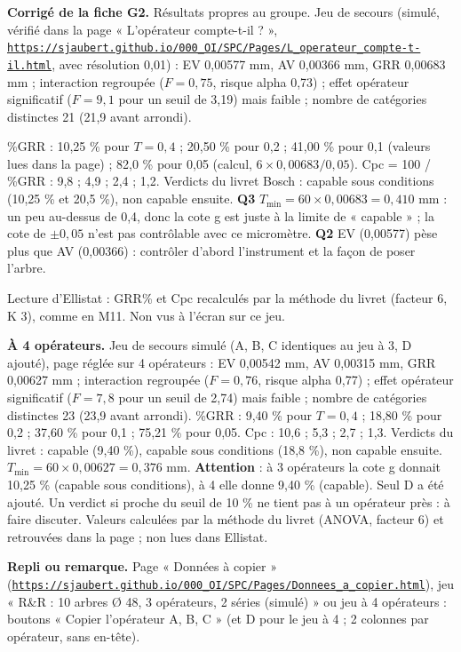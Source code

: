 \textbf{\color{ok}Corrigé de la fiche G2.} Résultats propres au groupe. Jeu de secours (simulé, vérifié dans la page « L'opérateur compte-t-il ? », \href{https://sjaubert.github.io/000_OI/SPC/Pages/L_operateur_compte-t-il.html}{\nolinkurl{https://sjaubert.github.io/000_OI/SPC/Pages/L_operateur_compte-t-il.html}}, avec résolution 0,01) : EV 0,00577 mm, AV 0,00366 mm, GRR 0,00683 mm ; interaction regroupée ($F = 0{,}75$, risque alpha 0,73) ; effet opérateur significatif ($F = 9{,}1$ pour un seuil de 3,19) mais faible ; nombre de catégories distinctes 21 (21,9 avant arrondi).\par \%GRR : 10,25 \% pour $T = 0{,}4$ ; 20,50 \% pour 0,2 ; 41,00 \% pour 0,1 (valeurs lues dans la page) ; 82,0 \% pour 0,05 (calcul, $6 \times 0{,}00683 / 0{,}05$). Cpc = 100 / \%GRR : 9,8 ; 4,9 ; 2,4 ; 1,2. Verdicts du livret Bosch : capable sous conditions (10,25 \% et 20,5 \%), non capable ensuite. \textbf{Q3} $T_{\min} = 60 \times 0{,}00683 = 0{,}410$ mm : un peu au-dessus de 0,4, donc la cote g est juste à la limite de « capable » ; la cote de $\pm 0{,}05$ n'est pas contrôlable avec ce micromètre. \textbf{Q2} EV (0,00577) pèse plus que AV (0,00366) : contrôler d'abord l'instrument et la façon de poser l'arbre.\par Lecture d'Ellistat : GRR\% et Cpc recalculés par la méthode du livret (facteur 6, K 3), comme en M11. Non vus à l'écran sur ce jeu.\par \textbf{À 4 opérateurs.} Jeu de secours simulé  (A, B, C identiques au jeu à 3, D ajouté), page réglée sur 4 opérateurs : EV 0,00542 mm, AV 0,00315 mm, GRR 0,00627 mm ; interaction regroupée ($F = 0{,}76$, risque alpha 0,77) ; effet opérateur significatif ($F = 7{,}8$ pour un seuil de 2,74) mais faible ; nombre de catégories distinctes 23 (23,9 avant arrondi). \%GRR : 9,40 \% pour $T = 0{,}4$ ; 18,80 \% pour 0,2 ; 37,60 \% pour 0,1 ; 75,21 \% pour 0,05. Cpc : 10,6 ; 5,3 ; 2,7 ; 1,3. Verdicts du livret : capable (9,40 \%), capable sous conditions (18,8 \%), non capable ensuite. $T_{\min} = 60 \times 0{,}00627 = 0{,}376$ mm. \textbf{Attention} : à 3 opérateurs la cote g donnait 10,25 \% (capable sous conditions), à 4 elle donne 9,40 \% (capable). Seul D a été ajouté. Un verdict si proche du seuil de 10 \% ne tient pas à un opérateur près : à faire discuter. Valeurs calculées par la méthode du livret (ANOVA, facteur 6) et retrouvées dans la page ; non lues dans Ellistat.\par
{\small\textbf{Repli ou remarque.} Page « Données à copier » (\href{https://sjaubert.github.io/000_OI/SPC/Pages/Donnees_a_copier.html}{\nolinkurl{https://sjaubert.github.io/000_OI/SPC/Pages/Donnees_a_copier.html}}), jeu « R\&R : 10 arbres Ø 48, 3 opérateurs, 2 séries (simulé) » ou jeu à 4 opérateurs : boutons « Copier l'opérateur A, B, C » (et D pour le jeu à 4 ; 2 colonnes par opérateur, sans en-tête).}\par

